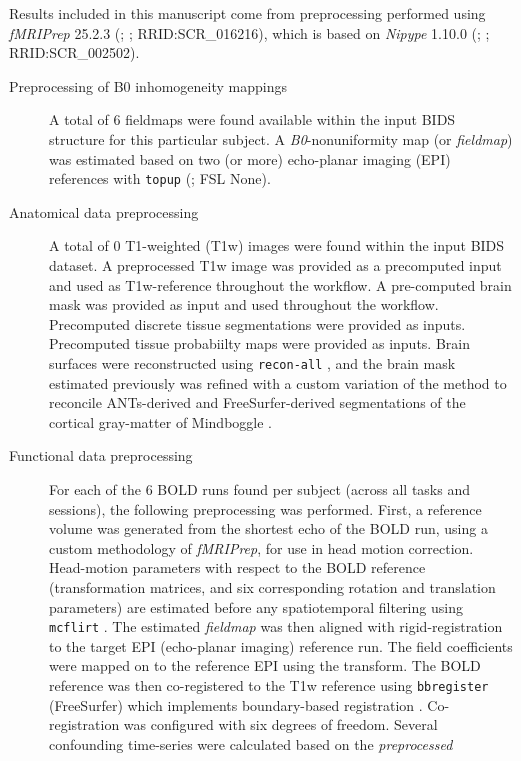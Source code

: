 \documentclass[
]{article}
\author{}
\date{}
\begin{document}
Results included in this manuscript come from preprocessing performed
using \emph{fMRIPrep} 25.2.3 (\citet{fmriprep1}; \citet{fmriprep2};
RRID:SCR\_016216), which is based on \emph{Nipype} 1.10.0
(\citet{nipype1}; \citet{nipype2}; RRID:SCR\_002502).

\begin{description}
\item[Preprocessing of B0 inhomogeneity mappings]
A total of 6 fieldmaps were found available within the input BIDS
structure for this particular subject. A \emph{B0}-nonuniformity map (or
\emph{fieldmap}) was estimated based on two (or more) echo-planar
imaging (EPI) references with \texttt{topup} (\citet{topup}; FSL None).
\item[Anatomical data preprocessing]
A total of 0 T1-weighted (T1w) images were found within the input BIDS
dataset. A preprocessed T1w image was provided as a precomputed input
and used as T1w-reference throughout the workflow. A pre-computed brain
mask was provided as input and used throughout the workflow. Precomputed
discrete tissue segmentations were provided as inputs. Precomputed
tissue probabiilty maps were provided as inputs. Brain surfaces were
reconstructed using \texttt{recon-all} \citep[FreeSurfer 7.3.2,
RRID:SCR\_001847,][]{fs_reconall}, and the brain mask estimated
previously was refined with a custom variation of the method to
reconcile ANTs-derived and FreeSurfer-derived segmentations of the
cortical gray-matter of Mindboggle
\citep[RRID:SCR\_002438,][]{mindboggle}.
\item[Functional data preprocessing]
For each of the 6 BOLD runs found per subject (across all tasks and
sessions), the following preprocessing was performed. First, a reference
volume was generated from the shortest echo of the BOLD run, using a
custom methodology of \emph{fMRIPrep}, for use in head motion
correction. Head-motion parameters with respect to the BOLD reference
(transformation matrices, and six corresponding rotation and translation
parameters) are estimated before any spatiotemporal filtering using
\texttt{mcflirt} \citep[FSL ,][]{mcflirt}. The estimated \emph{fieldmap}
was then aligned with rigid-registration to the target EPI (echo-planar
imaging) reference run. The field coefficients were mapped on to the
reference EPI using the transform. The BOLD reference was then
co-registered to the T1w reference using \texttt{bbregister}
(FreeSurfer) which implements boundary-based registration \citep{bbr}.
Co-registration was configured with six degrees of freedom. Several
confounding time-series were calculated based on the \emph{preprocessed
}
\end{description}
\end{document}
